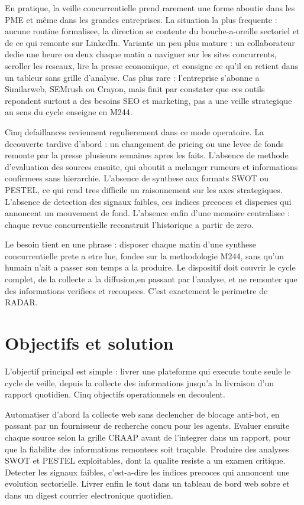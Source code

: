\documentclass[12pt,a4paper,openany]{report}
\begin{document}
En pratique, la veille concurrentielle prend rarement une forme aboutie dans les PME et même dans les grandes entreprises. La situation la plus frequente : aucune routine formalisee, la direction se contente du bouche-a-oreille sectoriel et de ce qui remonte sur LinkedIn. Variante un peu plus mature : un collaborateur dedie une heure ou deux chaque matin a naviguer sur les sites concurrents, scroller les reseaux, lire la presse economique, et consigne ce qu'il en retient dans un tableur sans grille d'analyse. Cas plus rare : l'entreprise s'abonne a Similarweb, SEMrush ou Crayon, mais finit par constater que ces outils repondent surtout a des besoins SEO et marketing, pas a une veille strategique au sens du cycle enseigne en M244.

Cinq defaillances reviennent regulierement dans ce mode operatoire. La decouverte tardive d'abord : un changement de pricing ou une levee de fonds remonte par la presse plusieurs semaines apres les faits. L'absence de methode d'evaluation des sources ensuite, qui aboutit a melanger rumeurs et informations confirmees sans hierarchie. L'absence de synthese aux formats SWOT ou PESTEL, ce qui rend tres difficile un raisonnement sur les axes strategiques. L'absence de detection des signaux faibles, ces indices precoces et disperses qui annoncent un mouvement de fond. L'absence enfin d'une memoire centralisee : chaque revue concurrentielle reconstruit l'historique a partir de zero.

Le besoin tient en une phrase : disposer chaque matin d'une synthese concurrentielle prete a etre lue, fondee sur la methodologie M244, sans qu'un humain n'ait a passer son temps a la produire. Le dispositif doit couvrir le cycle complet, de la collecte a la diffusion,en passant par l'analyse, et ne remonter que des informations verifiees et recoupees. C'est exactement le perimetre de RADAR.

\section{Objectifs et solution}
\label{sec:objectifs-solution}

L'objectif principal est simple : livrer une plateforme qui execute toute seule le cycle de veille, depuis la collecte des informations jusqu'a la livraison d'un rapport quotidien. Cinq objectifs operationnels en decoulent.

Automatiser d'abord la collecte web sans declencher de blocage anti-bot, en passant par un fournisseur de recherche concu pour les agents. Evaluer ensuite chaque source selon la grille CRAAP avant de l'integrer dans un rapport, pour que la fiabilite des informations remontees soit traçable. Produire des analyses SWOT et PESTEL exploitables, dont la qualite resiste a un examen critique. Detecter les signaux faibles, c'est-a-dire les indices precoces qui annoncent une evolution sectorielle. Livrer enfin le tout dans un tableau de bord web sobre et dans un digest courrier electronique quotidien.
\end{document}

